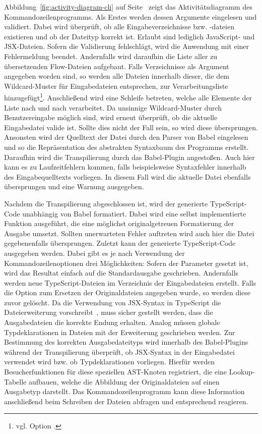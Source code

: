 {Abbildung~\ref{fig:activity-diagram-cli} auf Seite~\pageref{fig:activity-diagram-cli} zeigt das Aktivitätsdiagramm des Kommandozeilenprogramms. Als Erstes werden dessen Argumente eingelesen und validiert. Dabei wird überprüft, ob alle Eingabeverzeichnisse bzw. -dateien existieren und ob der Dateityp korrekt ist. Erlaubt sind lediglich JavaScript- und JSX-Dateien. Sofern die Validierung fehlschlägt, wird die Anwendung mit einer Fehlermeldung beendet. Andernfalls wird daraufhin die Liste aller zu übersetzenden Flow-Dateien aufgebaut. Falls Verzeichnisse als Argument angegeben worden sind, so werden alle Dateien innerhalb dieser, die dem Wildcard-Muster für Eingabedateien entsprechen, zur Verarbeitungsliste hinzugefügt\footnote{vgl. Option .}. Anschließend wird eine Schleife betreten, welche alle Elemente der Liste nach und nach verarbeitet. Da unsinnige Wildcard-Muster durch Benutzereingabe möglich sind, wird erneut überprüft, ob die aktuelle Eingabedatei valide ist. Sollte dies nicht der Fall sein, so wird diese übersprungen. Ansonsten wird der Quelltext der Datei durch den Parser von Babel eingelesen und so die Repräsentation des abstrakten Syntaxbaum des Programms erstellt. Daraufhin wird die Transpilierung durch das Babel-Plugin angestoßen. Auch hier kann es zu Laufzeitfehlern kommen, falls beispielsweise Syntaxfehler innerhalb des Eingabequelltexts vorliegen. In diesem Fall wird die aktuelle Datei ebenfalls übersprungen und eine Warnung ausgegeben.

Nachdem die Transpilierung abgeschlossen ist, wird der generierte TypeScript-Code unabhängig von Babel formatiert. Dabei wird eine selbst implementierte Funktion ausgeführt, die eine möglichst originalgetreuen Formatierung der Ausgabe umsetzt. Sollten unerwarteten Fehler auftreten wird auch hier die Datei gegebenenfalls übersprungen. Zuletzt kann der generierte TypeScript-Code ausgegeben werden. Dabei gibt es je nach Verwendung der Kommandozeilenoptionen drei Möglichkeiten: Sofern der Parameter  gesetzt ist, wird das Resultat einfach auf die Standardausgabe geschrieben. Andernfalls werden neue TypeScript-Dateien im Verzeichnis der Eingabedateien erstellt. Falls die Option zum Ersetzen der Originaldateien angegeben wurde, so werden diese zuvor gelöscht.
Da die Verwendung von JSX-Syntax in TypeScript die Dateierweiterung  vorschreibt~\autocite{TYPESCRIPT_HANDBOOK:JSX}, muss sicher gestellt werden, dass die Ausgabedateien die korrekte Endung erhalten. Analog müssen globale Typdeklarationen in Dateien mit der Erweiterung  geschrieben werden. Zur Bestimmung des korrekten Ausgabedateityps wird innerhalb des Babel-Plugins während der Transpilierung überprüft, ob JSX-Syntax in der Eingabedatei verwendet wird bzw. ob Typdeklarationen vorliegen. Hierfür werden Besucherfunktionen für diese speziellen AST-Knoten registriert, die eine Lookup-Tabelle aufbauen, welche die Abbildung der Originaldateien auf einen Ausgabetyp darstellt. Das Kommandozeilenprogramm kann diese Information anschließend beim Schreiben der Dateien abfragen und entsprechend reagieren.

}
